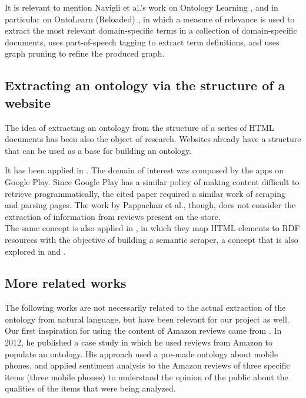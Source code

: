 \documentclass[LaM,oneside,binding=0.6cm]{sapthesis}
\begin{document}
It is relevant to mention Navigli et al.'s work on Ontology Learning \parencite{navigli_ontology_2003}, and in particular on OntoLearn (Reloaded) \parencite{velardi_ontolearn_2013}, in which a measure of relevance is used to extract the most relevant domain-specific terms in a collection of domain-specific documents, uses part-of-speech tagging to extract term definitions, and uses graph pruning to refine the produced graph.

\subsection{Extracting an ontology via the structure of a website}
The idea of extracting an ontology from the structure of a series of HTML documents has been also the object of research. Websites already have a structure that can be used as a base for building an ontology. 

It has been applied in \parencite{pappachan_building_2015}. The domain of interest was composed by the apps on Google Play. Since Google Play has a similar policy of making content difficult to retrieve programmatically, the cited paper required a similar work of scraping and parsing pages. The work by Pappachan et al., though, does not consider the extraction of information from reviews present on the store. \\

The same concept is also applied in \cite{fernandez_villamor_semantic_2011}, in which they map HTML elements to RDF resources with the objective of building a semantic scraper, a concept that is also explored in \parencite{liu_xwrap:_2000} and \parencite{muslea_hierarchical_2001}.

\subsection{More related works}

The following works are not necessarily related to the actual extraction of the ontology from natural language, but have been relevant for our project as well. \\

Our first inspiration for using the content of Amazon reviews came from \parencite{haider_ontology_2012}. In 2012, he published a case study in which he used reviews from Amazon to populate an ontology. His approach used a pre-made ontology about mobile phones, and applied sentiment analysis to the Amazon reviews of three specific items (three mobile phones) to understand the opinion of the public about the qualities of the items that were being analyzed. \\
\end{document}
